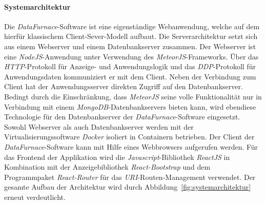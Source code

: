 \documentclass[
  language=german, %
  type=bachelor,%
  ngerman
]{isthesis}
\begin{document}
\begin{content}
  \paragraph{Systemarchitektur}
  Die \textit{DataFurnace}-Software ist eine eigenständige  Webanwendung,
  welche auf dem hierfür klassischem Client-Sever-Modell aufbaut. Die
  Serverarchitektur setzt sich aus einem Webserver und einem Datenbankserver
  zusammen. Der Webserver ist eine \textit{NodeJS}-Anwendung unter Verwendung
  des \textit{MeteorJS}-Frameworks. Über das \textit{HTTP}-Protokoll für
  Anzeige- und Anwendungslogik und das \textit{DDP}-Protokoll für
  Anwendungsdaten kommuniziert er mit dem Client. Neben der Verbindung zum
  Client hat der Anwendungsserver direkten Zugriff auf den Datenbankserver.
  Bedingt durch die Einschränkung, dass \textit{MeteorJS} seine volle
  Funktionalität nur in Verbindung mit einem \textit{MongoDB}-Datenbankservers
  bieten kann, wird ebendiese Technologie für den Datenbankserver der
  \textit{DataFurnace}-Software eingesetzt. Sowohl Webserver als auch
  Datenbankserver werden mit der Virtualisierungssoftware \textit{Docker}
  isoliert in Containern betrieben.  Der Client der
  \textit{DataFurnace}-Software kann mit Hilfe eines Webbrowsers aufgerufen
  werden. Für das Frontend der Applikation wird die
  \textit{Javascript}-Bibliothek \textit{ReactJS} in Kombination mit der
  Anzeigebibliothek \textit{React-Bootstrap} und dem Programmpaket
  \textit{React-Router} für das \textit{URI}-Routen-Management verwendet.  Der
  gesamte Aufbau der Architektur wird durch
  Abbildung~\ref{fig:systemarchitektur} erneut verdeutlicht.

  \begin{figure}
		\footnotesize
\end{figure}
\end{content}
\end{document}

